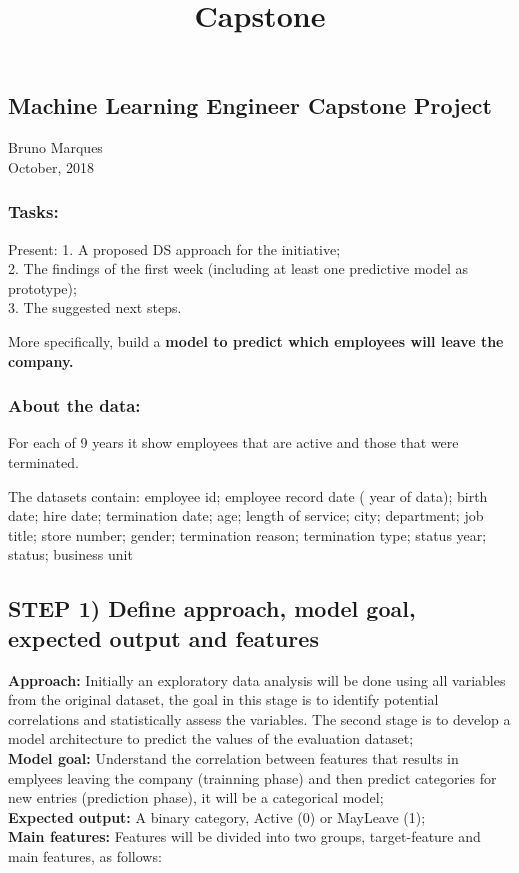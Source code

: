 \documentclass[11pt]{article}
\title{Capstone}
\begin{document}
    
    
    \maketitle
    
    

    
    \subsection{Machine Learning Engineer Capstone
Project}\label{machine-learning-engineer-capstone-project}

Bruno Marques\\
October, 2018

\subsubsection{Tasks:}\label{tasks}

Present: 1. A proposed DS approach for the initiative;\\
2. The findings of the first week (including at least one predictive
model as prototype);\\
3. The suggested next steps.

More specifically, build a \textbf{model to predict which employees will
leave the company.}

\subsubsection{About the data:}\label{about-the-data}

For each of 9 years it show employees that are active and those that
were terminated.

The datasets contain: employee id; employee record date ( year of data);
birth date; hire date; termination date; age; length of service; city;
department; job title; store number; gender; termination reason;
termination type; status year; status; business unit

    \subsection{STEP 1) Define approach, model goal, expected output and
features}\label{step-1-define-approach-model-goal-expected-output-and-features}

\textbf{Approach:} Initially an exploratory data analysis will be done
using all variables from the original dataset, the goal in this stage is
to identify potential correlations and statistically assess the
variables. The second stage is to develop a model architecture to
predict the values of the evaluation dataset;\\
\textbf{Model goal:} Understand the correlation between features that
results in emplyees leaving the company (trainning phase) and then
predict categories for new entries (prediction phase), it will be a
categorical model;\\
\textbf{Expected output:} A binary category, Active (0) or MayLeave
(1);\\
\textbf{Main features:} Features will be divided into two groups,
target-feature and main features, as follows:
\end{document}
